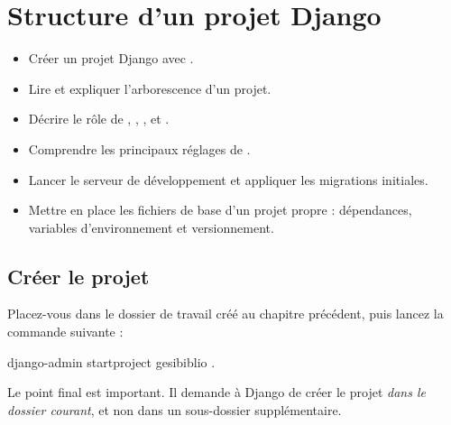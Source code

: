 \chapter{Structure d'un projet Django}
\label{ch:structure}


\begin{objectifs}
\begin{itemize}
  \item Créer un projet Django avec .
  \item Lire et expliquer l'arborescence d'un projet.
  \item Décrire le rôle de , , ,
         et .
  \item Comprendre les principaux réglages de .
  \item Lancer le serveur de développement et appliquer les migrations initiales.
  \item Mettre en place les fichiers de base d'un projet propre : dépendances,
        variables d'environnement et versionnement.
\end{itemize}
\end{objectifs}

\section{Créer le projet}

Placez-vous dans le dossier de travail créé au chapitre précédent, puis lancez la
commande suivante :

\begin{terminal}
django-admin startproject gesibiblio .
\end{terminal}

Le point final est important. Il demande à Django de créer le projet
\emph{dans le dossier courant}, et non dans un sous-dossier supplémentaire.

